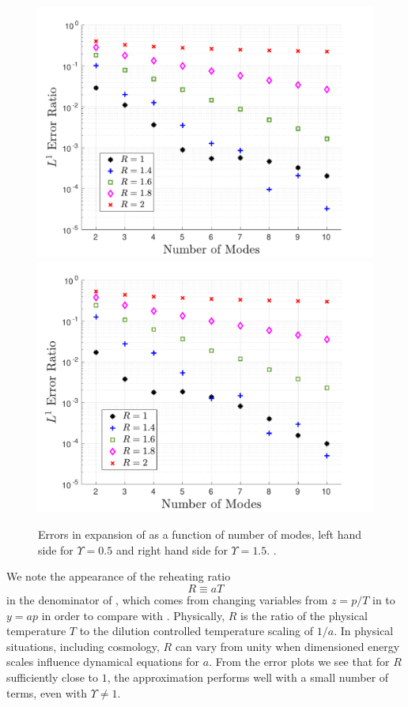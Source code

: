 \begin{figure}
\centerline{ 
\includegraphics[width=0.48\linewidth]{plots/free_stream_f0_approx_Ups_5.pdf} \includegraphics[width=0.48\linewidth]{plots/free_stream_f0_approx_Ups_1_5.pdf}}
\caption{Errors in expansion of  as a function of number of modes, left hand side for $\Upsilon=0.5$ and right hand side for $\Upsilon=1.5$. .}\label{fig:freeStreamf0approxUps5}
\end{figure}

We note the appearance of the reheating ratio
\begin{equation}\label{reheat}
 R\equiv aT  
\end{equation}
in the denominator of , which comes from changing variables from $z=p/T$ in  to $y=ap$ in order to compare with .  Physically, $R$ is the ratio of the physical temperature $T$ to the dilution controlled temperature scaling  of $1/a$.   In physical situations, including cosmology, $R$ can vary from unity when dimensioned energy scales influence dynamical equations for $a$. From the error plots we see that for $R$ sufficiently close to $1$, the approximation performs well with a small number of terms, even with $\Upsilon\neq 1$.  

